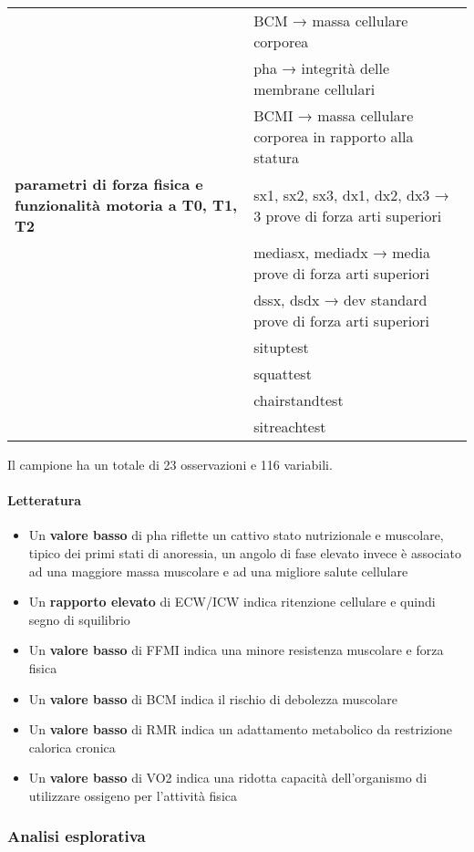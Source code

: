 \documentclass[
]{article}
\providecommand{\tightlist}{%
  \setlength{\itemsep}{0pt}\setlength{\parskip}{0pt}}
\begin{document}
\begin{longtable}[]{@{}
  >{\raggedright\arraybackslash}p{}
  >{\raggedright\arraybackslash}p{}@{}}
~ & BCM → massa cellulare corporea \\
~ & pha → integrità delle membrane cellulari \\
~ & BCMI → massa cellulare corporea in rapporto alla statura \\
\textbf{parametri di forza fisica e funzionalità motoria a T0, T1, T2} &
sx1, sx2, sx3, dx1, dx2, dx3 → 3 prove di forza arti superiori \\
~ & mediasx, mediadx → media prove di forza arti superiori \\
~ & dssx, dsdx → dev standard prove di forza arti superiori \\
~ & situptest \\
~ & squattest \\
~ & chairstandtest \\
~ & sitreachtest \\
\end{longtable}

Il campione ha un totale di 23 osservazioni e 116 variabili.

\paragraph{Letteratura}\label{letteratura}

\begin{itemize}
\tightlist
\item
  Un \textbf{valore basso} di pha riflette un cattivo stato nutrizionale
  e muscolare, tipico dei primi stati di anoressia, un angolo di fase
  elevato invece è associato ad una maggiore massa muscolare e ad una
  migliore salute cellulare
\item
  Un \textbf{rapporto elevato} di ECW/ICW indica ritenzione cellulare e
  quindi segno di squilibrio
\item
  Un \textbf{valore basso} di FFMI indica una minore resistenza
  muscolare e forza fisica
\item
  Un \textbf{valore basso} di BCM indica il rischio di debolezza
  muscolare
\item
  Un \textbf{valore basso} di RMR indica un adattamento metabolico da
  restrizione calorica cronica
\item
  Un \textbf{valore basso} di VO2 indica una ridotta capacità
  dell'organismo di utilizzare ossigeno per l'attività fisica
\end{itemize}

\subsubsection{Analisi esplorativa}\label{analisi-esplorativa}
\end{document}
